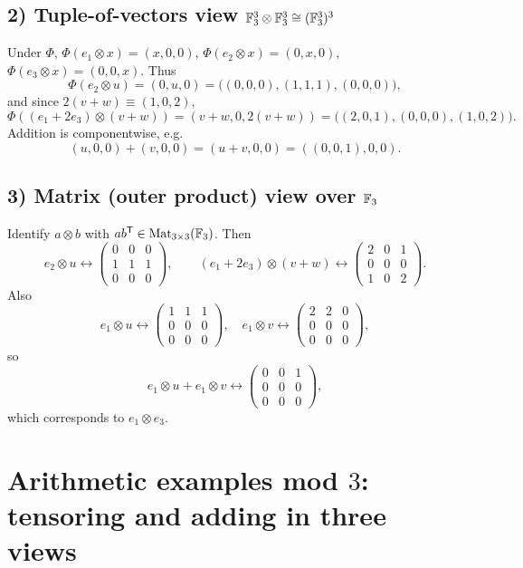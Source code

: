 \documentclass[12pt,a4paper]{article}
\theoremstyle{plain}
\theoremstyle{definition}      %
\begin{document}
\subsection*{2) Tuple-of-vectors view \(\Bbb F_3^3\otimes \Bbb F_3^3 \cong (\Bbb F_3^3)^3\)}
Under \(\Phi\), \(\Phi(e_1\otimes x)=(x,0,0)\), \(\Phi(e_2\otimes x)=(0,x,0)\), \(\Phi(e_3\otimes x)=(0,0,x)\).
Thus
\[
\Phi(e_2\otimes u)=(0,u,0)=\big((0,0,0),(1,1,1),(0,0,0)\big),
\]
and since \(2(v+w)\equiv(1,0,2)\),
\[
\Phi((e_1+2e_3)\otimes(v+w))
=(v+w,0,2(v+w))
=\big((2,0,1),(0,0,0),(1,0,2)\big).
\]
Addition is componentwise, e.g.
\[
(u,0,0)+(v,0,0)=(u+v,0,0)=((0,0,1),0,0).
\]

\subsection*{3) Matrix (outer product) view over \(\Bbb F_3\)}
Identify \(a\otimes b\) with \(ab^{\mathsf T}\in \mathrm{Mat}_{3\times 3}(\Bbb F_3)\).
Then
\[
e_2\otimes u \leftrightarrow
\begin{pmatrix}
	0&0&0\\
	1&1&1\\
	0&0&0
\end{pmatrix},
\qquad
(e_1+2e_3)\otimes(v+w)\leftrightarrow
\begin{pmatrix}
	2&0&1\\
	0&0&0\\
	1&0&2
\end{pmatrix}.
\]
Also
\[
e_1\otimes u \leftrightarrow
\begin{pmatrix}
	1&1&1\\0&0&0\\0&0&0
\end{pmatrix},\quad
e_1\otimes v \leftrightarrow
\begin{pmatrix}
	2&2&0\\0&0&0\\0&0&0
\end{pmatrix},
\]
so
\[
e_1\otimes u + e_1\otimes v \leftrightarrow
\begin{pmatrix}
	0&0&1\\0&0&0\\0&0&0
\end{pmatrix},
\]
which corresponds to \(e_1\otimes e_3\).


\section*{Arithmetic examples mod \(3\): tensoring and adding in three views}
\end{document}
